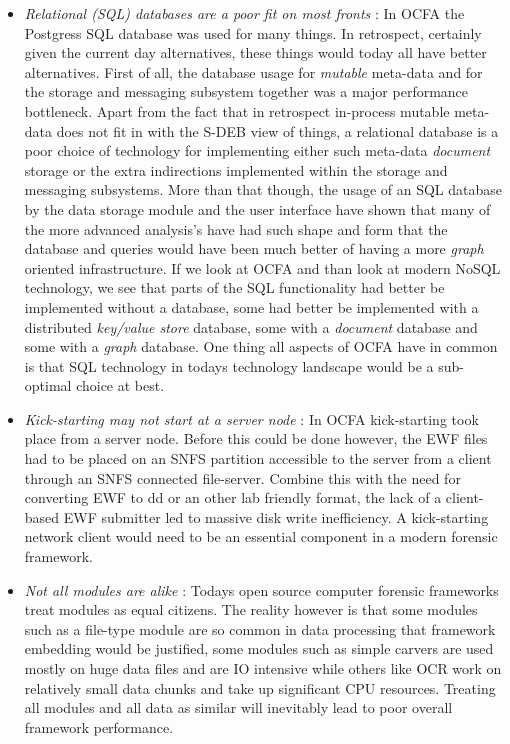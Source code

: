 \begin{itemize}
\item \emph{Relational (SQL) databases are a poor fit on most fronts} : In OCFA the Postgress SQL database was used for many things. In retrospect, certainly given the current day alternatives, these things would today all have better alternatives. First of all, the database usage for \emph{mutable} meta-data and for the storage and messaging subsystem together was a major performance bottleneck. Apart from the fact that in retrospect in-process mutable meta-data does not fit in with the S-DEB view of things, a relational database is a poor choice of technology for implementing either such meta-data \emph{document} storage or the extra indirections implemented within the storage and messaging subsystems. More than that though, the usage of an SQL database by the data storage module and the user interface have shown that many of the more advanced analysis's have had such shape and form that the database and queries would have been much better of having a more \emph{graph} oriented infrastructure. If we look at OCFA and than look at modern NoSQL technology, we see that parts of the SQL functionality had better be implemented without a database, some had better be implemented with a distributed \emph{key/value store} database, some with a \emph{document} database and some with a \emph{graph} database.  One thing all aspects of OCFA have in common is that SQL technology in todays technology landscape would be a sub-optimal choice at best. 
\item \emph{Kick-starting may not start at a server node} : In OCFA kick-starting took place from a server node. Before this could be done however, the EWF files had to be placed on an SNFS partition accessible to the server from a client through an SNFS connected file-server. Combine this with the need for converting EWF to dd or an other lab friendly format, the lack of a client-based EWF submitter led to massive disk write inefficiency. A kick-starting network client would need to be an essential component in a modern forensic framework.
\item \emph{Not all modules are alike} : Todays open source computer forensic frameworks treat modules as equal citizens. The reality however is that some modules such as a file-type module are so common in data processing that framework embedding would be justified, some modules such as simple carvers are used mostly on huge data files and are IO intensive while others like OCR work on relatively small data chunks and take up significant CPU resources. Treating all modules and all data as similar will inevitably lead to poor overall framework performance. 

\end{itemize}
